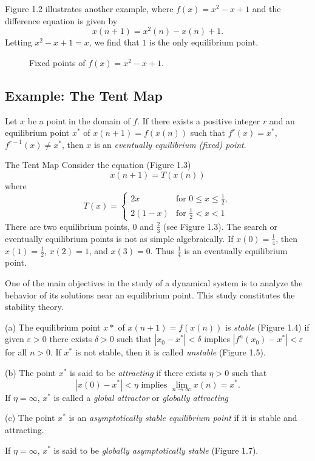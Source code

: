 Figure 1.2 illustrates another example, where $f(x)=x^2-x+1$ and the difference equation is given by
\[x(n+1)=x^2(n)-x(n)+1.\]
Letting $x^2-x+1=x$, we find that $1$ is the only equilibrium point.
\begin{figure}[H]
    \centering
    \caption{Fixed points of $f(x)=x^2-x+1$.}
\end{figure}

\subsection{Example: The Tent Map}

\begin{definition}
    Let $x$ be a point in the domain of $f$. If there exists a positive integer $r$ and an equilibrium point $x^*$ of $x(n+1)=f(x(n))$ such that $f^r(x)=x^*$, $f^{r-1}(x)\neq x^*$, then $x$ is an \textit{eventually equilibrium (fixed) point}.
\end{definition}

\begin{eg}
    \item The Tent Map
        Consider the equation (Figure 1.3)
        \[x(n+1)=T(x(n))\]
        where
        \[
            T(x)=\begin{cases}
                2x & \text{for }0\leq x\leq\frac{1}{2}, \\
                2(1-x) & \text{for }\frac{1}{2}<x<1
            \end{cases}
        \]
        There are two equilibrium points, $0$ and $\frac{2}{3}$ (see Figure 1.3). The search or eventually equilibrium points is not as simple algebraically. If $x(0)=\frac{1}{4}$, then $x(1)=\frac{1}{2}$, $x(2)=1$, and $x(3)=0$. Thus $\frac{1}{4}$ is an eventually equilibrium point.
\end{eg}

One of the main objectives in the study of a dynamical system is to analyze the behavior of its solutions near an equilibrium point. This study constitutes the stability theory.

\begin{definition}
    (a) The equilibrium point $x*$ of $x(n+1)=f(x(n))$ is \textit{stable} (Figure 1.4) if given $\varepsilon>0$ there exists $\delta>0$ such that $|x_0-x^*|<\delta$ implies $|f^n(x_0)-x^*|<\varepsilon$ for all $n>0$. If $x^*$ is not stable, then it is called \textit{unstable} (Figure 1.5).

    (b) The point $x^*$ is said to be \textit{attracting} if there exists $\eta>0$ such that
    \[|x(0)-x^*|<\eta\text{ implies }\lim_{n\to\infty} x(n)=x^*.\]
    If $\eta=\infty$, $x^*$ is called a \textit{global attractor} or \textit{globally attracting}
    
    (c) The point $x^*$ is an \textit{asymptotically stable equilibrium point} if it is stable and attracting.

    If $\eta=\infty$, $x^*$ is said to be \textit{globally asymptotically stable} (Figure 1.7).
\end{definition}
